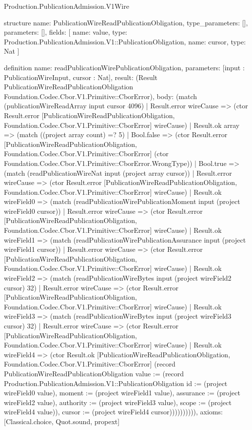 \begin{lexlean}{Production.PublicationAdmission.V1Wire}
\begin{semanticmodule}
structure{
  name: PublicationWireReadPublicationObligation,
  type_parameters: [],
  parameters: [],
  fields: [
    {name: value, type: Production.PublicationAdmission.V1::PublicationObligation},
    {name: cursor, type: Nat}
  ]
}

definition{
  name: readPublicationWirePublicationObligation,
  parameters: [input : PublicationWireInput, cursor : Nat],
  result: (Result PublicationWireReadPublicationObligation Foundation.Codec.Cbor.V1.Primitive::CborError),
  body: (match (publicationWireReadArray input cursor 4096)
    | Result.error wireCause => (ctor Result.error [PublicationWireReadPublicationObligation, Foundation.Codec.Cbor.V1.Primitive::CborError] wireCause)
    | Result.ok array => (match ((project array count) =? 5)
      | Bool.false => (ctor Result.error [PublicationWireReadPublicationObligation, Foundation.Codec.Cbor.V1.Primitive::CborError] (ctor Foundation.Codec.Cbor.V1.Primitive::CborError.WrongType))
      | Bool.true => (match (readPublicationWireNat input (project array cursor))
        | Result.error wireCause => (ctor Result.error [PublicationWireReadPublicationObligation, Foundation.Codec.Cbor.V1.Primitive::CborError] wireCause)
        | Result.ok wireField0 => (match (readPublicationWirePublicationMoment input (project wireField0 cursor))
          | Result.error wireCause => (ctor Result.error [PublicationWireReadPublicationObligation, Foundation.Codec.Cbor.V1.Primitive::CborError] wireCause)
          | Result.ok wireField1 => (match (readPublicationWirePublicationAssurance input (project wireField1 cursor))
            | Result.error wireCause => (ctor Result.error [PublicationWireReadPublicationObligation, Foundation.Codec.Cbor.V1.Primitive::CborError] wireCause)
            | Result.ok wireField2 => (match (readPublicationWireBytes input (project wireField2 cursor) 32)
              | Result.error wireCause => (ctor Result.error [PublicationWireReadPublicationObligation, Foundation.Codec.Cbor.V1.Primitive::CborError] wireCause)
              | Result.ok wireField3 => (match (readPublicationWireBytes input (project wireField3 cursor) 32)
                | Result.error wireCause => (ctor Result.error [PublicationWireReadPublicationObligation, Foundation.Codec.Cbor.V1.Primitive::CborError] wireCause)
                | Result.ok wireField4 => (ctor Result.ok [PublicationWireReadPublicationObligation, Foundation.Codec.Cbor.V1.Primitive::CborError] (record PublicationWireReadPublicationObligation {value := (record Production.PublicationAdmission.V1::PublicationObligation {id := (project wireField0 value), moment := (project wireField1 value), assurance := (project wireField2 value), authority := (project wireField3 value), scope := (project wireField4 value)}), cursor := (project wireField4 cursor)}))))))))),
  axioms: [Classical.choice, Quot.sound, propext]
}


\end{semanticmodule}
\end{lexlean}
